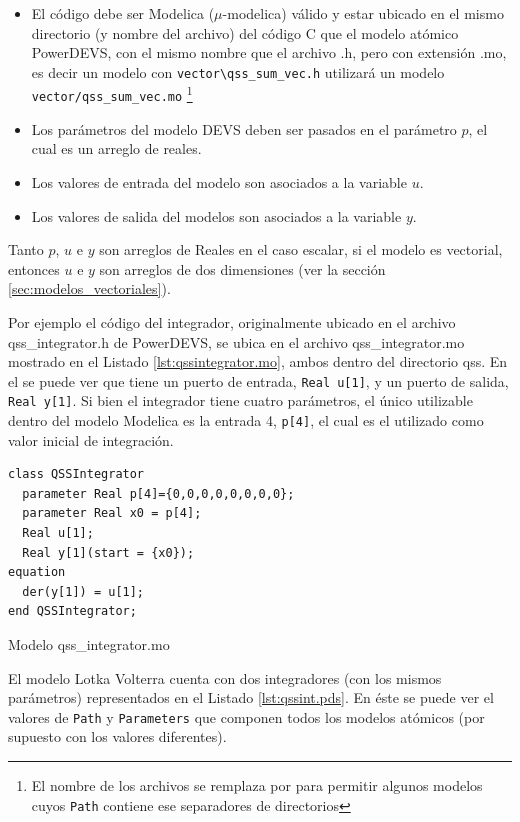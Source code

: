 \begin{itemize}
        \item El código debe ser Modelica ($\mu$-modelica) válido y estar ubicado en el mismo directorio (y nombre del archivo) del código C que el modelo atómico 
        PowerDEVS, con el mismo nombre que el archivo .h, pero con extensión .mo, es decir un modelo con \texttt{vector\textbackslash qss\_sum\_vec.h} 
	utilizará un modelo \texttt{vector/qss\_sum\_vec.mo} \footnote{El nombre de los archivos se remplaza \quotes{\textbackslash} por \quotes{/} para permitir 
	algunos modelos cuyos \texttt{Path} contiene ese separadores de directorios}
        \item Los parámetros del modelo DEVS deben ser pasados en el parámetro $p$, el cual es un arreglo de reales. 
        \item Los valores de entrada del modelo son asociados a la variable $u$.
        \item Los valores de salida del modelos son asociados a la variable $y$.
\end{itemize}

	Tanto $p$, $u$ e $y$ son arreglos de Reales en el caso escalar, si el modelo es vectorial, entonces $u$ e $y$ son arreglos de dos dimensiones (ver la sección \ref{sec:modelos_vectoriales}).

        Por ejemplo el código del integrador, originalmente ubicado en el archivo qss\_integrator.h de PowerDEVS, se ubica en el archivo qss\_integrator.mo 
	mostrado en el Listado \ref{lst:qssintegrator.mo}, ambos dentro del directorio qss. En el se puede ver que tiene un puerto de entrada, \texttt{Real u[1]},
	y un puerto de salida, \texttt{Real y[1]}. Si bien el integrador tiene cuatro parámetros, el único utilizable dentro del modelo Modelica es la entrada 4, 
	\texttt{p[4]}, el cual es el utilizado como valor inicial de integración.

\begin{listing}[H]
\begin{verbatim}
class QSSIntegrator
  parameter Real p[4]={0,0,0,0,0,0,0,0};
  parameter Real x0 = p[4];
  Real u[1];
  Real y[1](start = {x0});
equation
  der(y[1]) = u[1];
end QSSIntegrator;
\end{verbatim}
\caption{Modelo qss\_integrator.mo}\label{lst:qssintegrator.mo}
\end{listing}

        El modelo Lotka Volterra cuenta con dos integradores (con los mismos parámetros) representados en el Listado \ref{lst:qssint.pds}. En éste se puede ver 
        el valores de \texttt{Path} y \texttt{Parameters} que componen todos los modelos atómicos (por supuesto con los valores diferentes).

